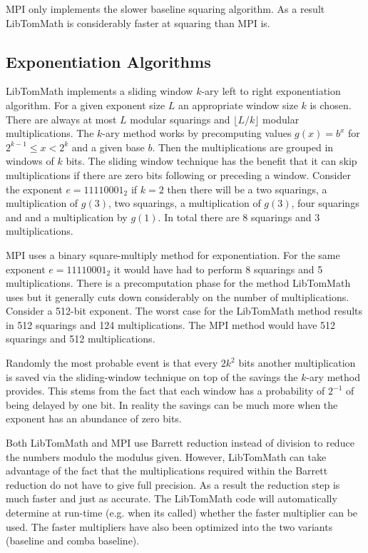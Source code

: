 \documentclass[]{article}
\begin{document}
MPI only implements the slower baseline squaring algorithm.  As a result LibTomMath is considerably faster at squaring
than MPI is.

\subsection{Exponentiation Algorithms}

LibTomMath implements a sliding window $k$-ary left to right exponentiation algorithm.  For a given exponent size $L$ an
appropriate window size $k$ is chosen.  There are always at most $L$ modular squarings and $\lfloor L/k \rfloor$ modular
multiplications.   The $k$-ary method works by precomputing values $g(x) = b^x$ for $2^{k-1} \le x < 2^k$ and a given base 
$b$.  Then the multiplications are grouped in windows of $k$ bits.  The sliding window technique has the benefit 
that it can skip multiplications if there are zero bits following or preceding a window.  Consider the exponent 
$e = 11110001_2$ if $k = 2$ then there will be a two squarings, a multiplication of $g(3)$, two squarings, a multiplication
of $g(3)$, four squarings and and a multiplication by $g(1)$.  In total there are 8 squarings and 3 multiplications.

MPI uses a binary square-multiply method for exponentiation.  For the same exponent $e = 11110001_2$ it would have had to
perform 8 squarings and 5 multiplications.  There is a precomputation phase for the method LibTomMath uses but it 
generally cuts down considerably on the number of multiplications.  Consider a 512-bit exponent.  The worst case for the 
LibTomMath method results in 512 squarings and 124 multiplications.  The MPI method would have 512 squarings 
and 512 multiplications.  

Randomly the most probable event is that every $2k^2$ bits another multiplication is saved via the 
sliding-window technique on top of the savings the $k$-ary method provides.  This stems from the fact that each window
has a probability of $2^{-1}$ of being delayed by one bit.  In reality the savings can be much more when the exponent
has an abundance of zero bits.  

Both LibTomMath and MPI use Barrett reduction instead of division to reduce the numbers modulo the modulus given.
However, LibTomMath can take advantage of the fact that the multiplications required within the Barrett reduction
do not have to give full precision.  As a result the reduction step is much faster and just as accurate.  The LibTomMath 
code will automatically determine at run-time (e.g. when its called) whether the faster multiplier can be used.  The
faster multipliers have also been optimized into the two variants (baseline and comba baseline).
\end{document}
